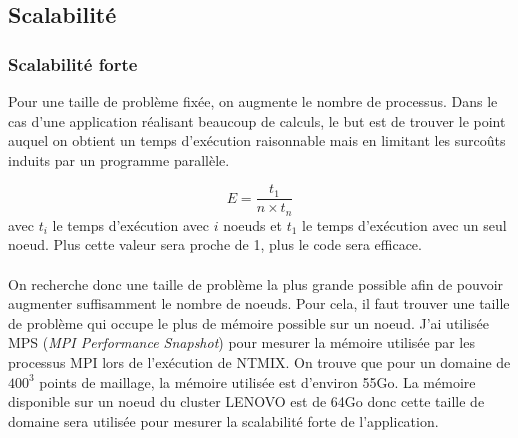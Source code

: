 



\subsection{Scalabilité}\label{sec:scal}

\subsubsection{Scalabilité forte}\label{sec:scal-strong}
Pour une taille de problème fixée, on augmente le nombre de processus. Dans le cas d'une application réalisant beaucoup de calculs, le but est de trouver le point auquel on obtient un temps d'exécution raisonnable mais en limitant les surcoûts induits par un programme parallèle.

$$E=\frac{t_1}{n\times t_n}$$ avec $t_i$ le temps d'exécution avec $i$ noeuds et $t_1$ le temps d'exécution avec un seul noeud. Plus cette valeur sera proche de 1, plus le code sera efficace.

\paragraph{}On recherche donc une taille de problème la plus grande possible afin de pouvoir augmenter suffisamment le nombre de noeuds. Pour cela, il faut trouver une taille de problème qui occupe le plus de mémoire possible sur un noeud. J'ai utilisée MPS (\textit{MPI Performance Snapshot}) pour mesurer la mémoire utilisée par les processus MPI lors de l'exécution de NTMIX. On trouve que pour un domaine de $400^3$ points de maillage, la mémoire utilisée est d'environ 55Go. La mémoire disponible sur un noeud du cluster LENOVO est de 64Go donc cette taille de domaine sera utilisée pour mesurer la scalabilité forte de l'application.


